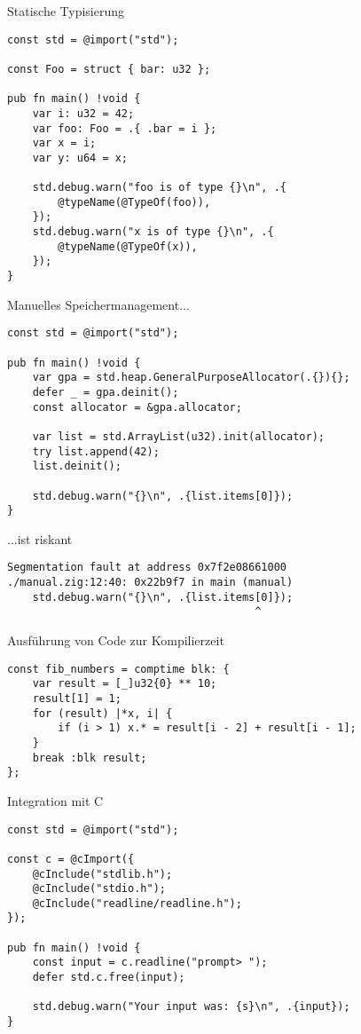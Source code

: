 \documentclass{beamer}
\begin{document}
\begin{frame}[fragile]{Statische Typisierung}
\begin{verbatim}
const std = @import("std");

const Foo = struct { bar: u32 };

pub fn main() !void {
    var i: u32 = 42;
    var foo: Foo = .{ .bar = i };
    var x = i;
    var y: u64 = x;

    std.debug.warn("foo is of type {}\n", .{
        @typeName(@TypeOf(foo)),
    });
    std.debug.warn("x is of type {}\n", .{
        @typeName(@TypeOf(x)),
    });
}
\end{verbatim}
\end{frame}

\begin{frame}[fragile]{Manuelles Speichermanagement...}
\begin{verbatim}
const std = @import("std");

pub fn main() !void {
    var gpa = std.heap.GeneralPurposeAllocator(.{}){};
    defer _ = gpa.deinit();
    const allocator = &gpa.allocator;

    var list = std.ArrayList(u32).init(allocator);
    try list.append(42);
    list.deinit();

    std.debug.warn("{}\n", .{list.items[0]});
}
\end{verbatim}
\end{frame}

\begin{frame}[fragile]{...ist riskant}
\begin{verbatim}
Segmentation fault at address 0x7f2e08661000
./manual.zig:12:40: 0x22b9f7 in main (manual)
    std.debug.warn("{}\n", .{list.items[0]});
                                       ^
\end{verbatim}
\end{frame}

\begin{frame}[fragile]{Ausführung von Code zur Kompilierzeit}
\begin{verbatim}
const fib_numbers = comptime blk: {
    var result = [_]u32{0} ** 10;
    result[1] = 1;
    for (result) |*x, i| {
        if (i > 1) x.* = result[i - 2] + result[i - 1];
    }
    break :blk result;
};
\end{verbatim}
\end{frame}

\begin{frame}[fragile]{Integration mit C}
\begin{verbatim}
const std = @import("std");

const c = @cImport({
    @cInclude("stdlib.h");
    @cInclude("stdio.h");
    @cInclude("readline/readline.h");
});

pub fn main() !void {
    const input = c.readline("prompt> ");
    defer std.c.free(input);

    std.debug.warn("Your input was: {s}\n", .{input});
}
\end{verbatim}
\end{frame}
\end{document}
